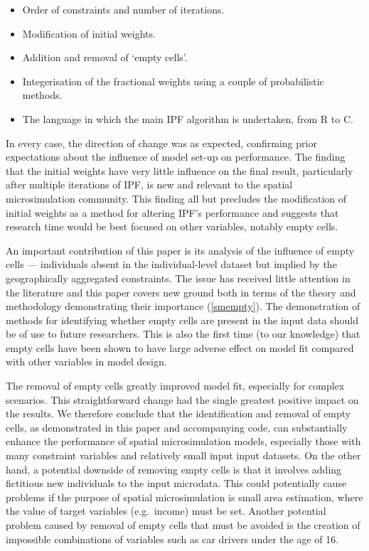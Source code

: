 \documentclass[a4paper,10pt]{article}
\begin{document}
\begin{itemize}
 \item Order of constraints and number of iterations.
 \item Modification of initial weights.
 \item Addition and removal of `empty cells'.
 \item Integerisation of the fractional weights using a couple of probabilistic methods.
 \item The language in which the main IPF algorithm is undertaken, from R to C.
\end{itemize}

In every case, the direction of change was as expected, confirming
prior expectations about the influence of model set-up on performance. The finding
that the initial weights have very little influence on the final result, particularly
after multiple iterations of IPF, is new and relevant to the spatial microsimulation
community. This finding all but precludes the modification of initial weights as
a method for altering IPF's performance and suggests that research time would be
best focused on other variables, notably empty cells.

An important contribution of this paper is its analysis of the influence
of empty cells --- individuals absent in the individual-level dataset but
implied by the geographically aggregated constraints.
The issue has received little attention in the literature and
this paper covers new ground both in terms of the theory and methodology demonstrating their importance
(\cref{smempty}). The demonstration of methods for identifying
whether empty cells are present in the input data should be of use to future researchers.
This is also the first time (to our knowledge) that empty cells have been shown to have
large adverse effect on model fit compared with other variables in model design.

The removal of empty cells greatly improved model fit,
especially for complex scenarios. This straightforward change had
the single greatest positive impact on the results.
We therefore conclude that the identification and removal of empty cells, as
demonstrated in this paper and accompanying code, can substantially enhance the performance of
spatial microsimulation models, especially those with many constraint variables and relatively
small input input datasets.
On the other hand, a potential downside of removing empty cells is that it involves adding fictitious
new individuals to the input microdata. This could potentially cause problems if the
purpose of spatial microsimulation is small area estimation, where the
value of target variables (e.g.~income) must be set.
Another potential problem caused by removal of empty cells that must be avoided is
the creation of impossible combinations of variables such as car drivers under
the age of 16.
\end{document}
